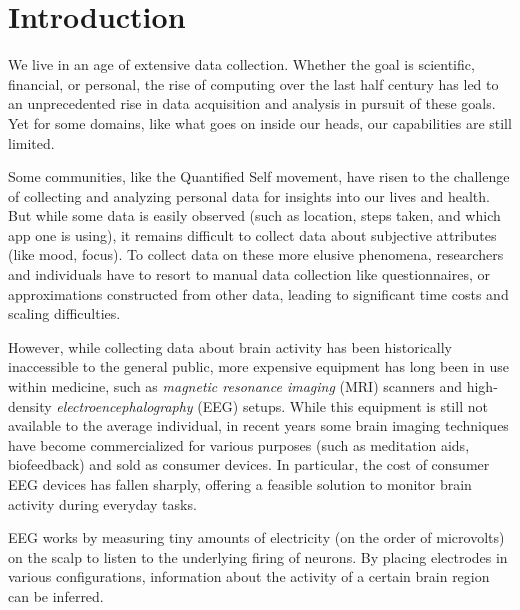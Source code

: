 \chapter{Introduction}




We live in an age of extensive data collection. Whether the goal is scientific, financial, or personal, the rise of computing over the last half century has led to an unprecedented rise in data acquisition and analysis in pursuit of these goals. Yet for some domains, like what goes on inside our heads, our capabilities are still limited.


Some communities, like the Quantified Self movement, have risen to the challenge of collecting and analyzing personal data for insights into our lives and health. But while some data is easily observed (such as location, steps taken, and which app one is using), it remains difficult to collect data about subjective attributes (like mood, focus). To collect data on these more elusive phenomena, researchers and individuals have to resort to manual data collection like questionnaires, or approximations constructed from other data, leading to significant time costs and scaling difficulties.\cite{malhi_promise_2017}


However, while collecting data about brain activity has been historically inaccessible to the general public, more expensive equipment has long been in use within medicine, such as \emph{magnetic resonance imaging} (MRI) scanners and high-density \emph{electroencephalography} (EEG) setups. While this equipment is still not available to the average individual, in recent years some brain imaging techniques have become commercialized for various purposes (such as meditation aids, biofeedback) and sold as consumer devices. In particular, the cost of consumer EEG devices has fallen sharply, offering a feasible solution to monitor brain activity during everyday tasks.

EEG works by measuring tiny amounts of electricity (on the order of microvolts) on the scalp to listen to the underlying firing of neurons. By placing electrodes in various configurations, information about the activity of a certain brain region can be inferred.

